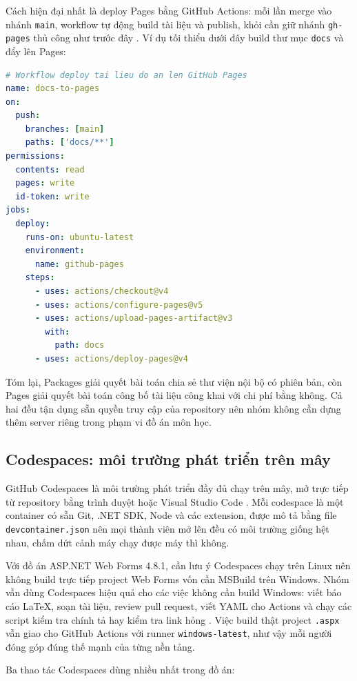 Cách hiện đại nhất là deploy Pages bằng GitHub Actions: mỗi lần merge vào
nhánh \verb|main|, workflow tự động build tài liệu và publish, khỏi cần giữ
nhánh \verb|gh-pages| thủ công như trước đây \cite{ghactions}.
Ví dụ tối thiểu dưới đây build thư mục \verb|docs| và đẩy lên Pages:

\begin{lstlisting}[language=yaml]
# Workflow deploy tai lieu do an len GitHub Pages
name: docs-to-pages
on:
  push:
    branches: [main]
    paths: ['docs/**']
permissions:
  contents: read
  pages: write
  id-token: write
jobs:
  deploy:
    runs-on: ubuntu-latest
    environment:
      name: github-pages
    steps:
      - uses: actions/checkout@v4
      - uses: actions/configure-pages@v5
      - uses: actions/upload-pages-artifact@v3
        with:
          path: docs
      - uses: actions/deploy-pages@v4
\end{lstlisting}

Tóm lại, Packages giải quyết bài toán chia sẻ thư viện nội bộ có phiên bản,
còn Pages giải quyết bài toán công bố tài liệu công khai với chi phí bằng không.
Cả hai đều tận dụng sẵn quyền truy cập của repository nên nhóm không cần
dựng thêm server riêng trong phạm vi đồ án môn học.

\subsection{Codespaces: môi trường phát triển trên mây}

GitHub Codespaces là môi trường phát triển đầy đủ chạy trên mây, mở trực tiếp
từ repository bằng trình duyệt hoặc Visual Studio Code \cite{githubdocs}.
Mỗi codespace là một container có sẵn Git, .NET SDK, Node và các extension,
được mô tả bằng file \verb|devcontainer.json| nên mọi thành viên mở lên đều
có môi trường giống hệt nhau, chấm dứt cảnh máy chạy được máy thì không.

Với đồ án ASP.NET Web Forms 4.8.1, cần lưu ý Codespaces chạy trên Linux nên
không build trực tiếp project Web Forms vốn cần MSBuild trên Windows.
Nhóm vẫn dùng Codespaces hiệu quả cho các việc không cần build Windows:
viết báo cáo LaTeX, soạn tài liệu, review pull request, viết YAML cho Actions
và chạy các script kiểm tra chính tả hay kiểm tra link hỏng \cite{msmsbuild}.
Việc build thật project \verb|.aspx| vẫn giao cho GitHub Actions với runner
\verb|windows-latest|, như vậy mỗi người đóng góp đúng thế mạnh của từng nền tảng.

Ba thao tác Codespaces dùng nhiều nhất trong đồ án:

